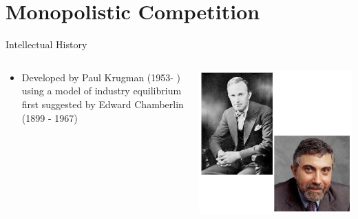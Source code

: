 \documentclass[10pt,hyperref={CJKbookmarks=true},xcolor=dvipsnames,aspectratio=169]{beamer}
\begin{document}
\section{Monopolistic Competition}
\begin{frame}{Intellectual History }


\begin{columns}[onlytextwidth]
\begin{column}{0.5\textwidth}
\begin{itemize}
\item Developed by Paul Krugman (1953- ) using a model of industry equilibrium
first suggested by Edward Chamberlin (1899 - 1967)
\end{itemize}

\end{column}
\begin{column}{0.5\textwidth}
\includegraphics[width=\columnwidth]{fig/krugman/lec6-13}
\end{column}
\end{columns}


\end{frame}
\end{document}
